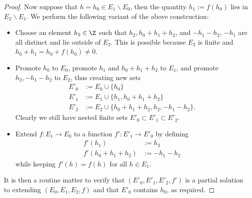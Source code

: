 \begin{proof}
Now suppose that $h = h_0 \in E_1 \backslash E_0$, then the quantity $h_1 := f(h_0)$ lies in $E_2 \backslash E_1$.  We perform the following variant of the above construction:
\begin{itemize}
\item Choose an element $h_2 \in \Z$ such that $h_2, h_0+h_1+h_2$, and $-h_1-h_2$, $-h_1$ are all distinct and lie outside of $E_2$.  This is possible because $E_2$ is finite and $h_0+h_1 = h_0+f(h_0) \neq 0$.
\item Promote $h_0$ to $E_0$, promote $h_1$ and $h_0+h_1+h_2$ to $E_1$, and promote $h_2, -h_1-h_2$ to $E_2$, thus creating new sets
\begin{align*}
  E'_0 &:= E_0 \cup \{h_0\} \\
  E'_1 &:= E_1 \cup \{h_1, h_0+h_1+h_2\} \\
  E'_2 &:= E_2 \cup \{h_0+h_1+h_2, h_2, -h_1-h_2\}.
\end{align*}
Clearly we still have nested finite sets $E'_0 \subset E'_1 \subset E'_2$.
\item Extend $f : E_1 \to E_0$ to a function $f': E'_1 \to E'_0$ by defining
\begin{align*}
  f'(h_1) &:= h_2 \\
  f'(h_0+h_1+h_2) &:= -h_1-h_2
\end{align*}
while keeping $f'(h)=f(h)$ for all $h \in E_1$.
\end{itemize}
It is then a routine matter to verify that $(E'_0,E'_1,E'_2,f')$ is a partial solution to  extending $(E_0,E_1,E_2,f)$ and that $E'_0$ contains $h_0$, as required.


\end{proof}

